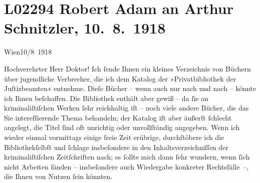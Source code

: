 

\section[Robert Adam an Arthur Schnitzler, 10. 8. 1918]{L02294 Robert Adam an Arthur Schnitzler, 10. 8. 1918}
\nopagebreak{}
\rehead{ }\normalsize\beginnumbering{}
\toendnotes[C]{\smallbreak\pagebreak[2]}
\toendnotes[C]{\smallbreak}
\toendnotes[C]{\smallbreak}
\pstart
           \centering{}{\pb}Wien10/8 1918\pend
           
\pstart\center{}Hochverehrter Herr Doktor!\pend\vspace{0.5em}
\pstart
           Ich{ }ſende Ihnen ein kleines Verzeichnis von Büchern über jugendliche Verbrecher, die
               ich dem Katalog der »Privatbibliothek der
                  Juſtizbeamten« entnehme. Dieſe Bücher – wenn auch nur nach und nach – könnte
               ich Ihnen beſchaffen. Die Bibliothek enthält aber gewiß – da{ }ſie an kriminaliſtiſchen Werken{ }ſehr
               reichhaltig iſt – noch viele andere Bücher, die das Sie intereſſierende Thema
               behandeln; der Katalog iſt aber äußerſt{ }ſchlecht angelegt, die Titel{ }ſind oft
               unrichtig oder {\pb}unvollſtändig angegeben.
               Wenn ich wieder einmal vormittags einige freie Zeit erübrige, durchſtöbere ich die
                  Bibliothekſelbſt und{ }ſchlage insbeſondere in den
               Inhaltsverzeichniſſen der kriminaliſtiſchen Zeitſchriften nach; es{ }ſollte mich dann{ }ſehr wundern, wenn{ }ſich nicht Arbeiten fänden – insbeſondere auch Wiedergabe
               konkreter Rechtsfälle –, die Ihnen von Nutzen{ }ſein könnten.\pend
           
